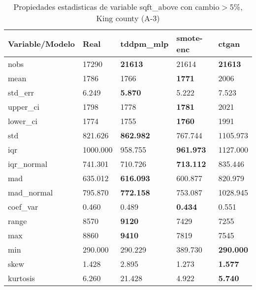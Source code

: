 \begin{table}[H]
\centering
\fontsize{8}{14}\selectfont
\caption{Propiedades estadisticas de variable sqft\_above con cambio\ensuremath{>}5\%, King county (A-3)}
\label{table-stats-king county-a-3-sqft_above-short}
\begin{tabular}{|l|m{10em}|m{10em}|m{10em}|m{10em}|}
\hline
 \rowcolor[gray]{0.8}
Variable/Modelo & Real & tddpm\_mlp & smote-enc & ctgan \\
\hline nobs & 17290 & \bfseries 21613 & \cellcolor[rgb]{0.9, 0.54, 0.52} 21614 & \bfseries 21613 \\
\hline mean & 1786 & 1766 & \bfseries 1771 & \cellcolor[rgb]{0.9, 0.54, 0.52} 2006 \\
\hline std\_err & 6.249 & \bfseries 5.870 & 5.222 & \cellcolor[rgb]{0.9, 0.54, 0.52} 7.523 \\
\hline upper\_ci & 1798 & 1778 & \bfseries 1781 & \cellcolor[rgb]{0.9, 0.54, 0.52} 2021 \\
\hline lower\_ci & 1774 & 1755 & \bfseries 1760 & \cellcolor[rgb]{0.9, 0.54, 0.52} 1991 \\
\hline std & 821.626 & \bfseries 862.982 & 767.744 & \cellcolor[rgb]{0.9, 0.54, 0.52} 1105.973 \\
\hline iqr & 1000.000 & 958.755 & \bfseries 961.973 & \cellcolor[rgb]{0.9, 0.54, 0.52} 1127.000 \\
\hline iqr\_normal & 741.301 & 710.726 & \bfseries 713.112 & \cellcolor[rgb]{0.9, 0.54, 0.52} 835.446 \\
\hline mad & 635.012 & \bfseries 616.093 & 600.877 & \cellcolor[rgb]{0.9, 0.54, 0.52} 820.979 \\
\hline mad\_normal & 795.870 & \bfseries 772.158 & 753.087 & \cellcolor[rgb]{0.9, 0.54, 0.52} 1028.945 \\
\hline coef\_var & 0.460 & 0.489 & \bfseries 0.434 & \cellcolor[rgb]{0.9, 0.54, 0.52} 0.551 \\
\hline range & 8570 & \bfseries 9120 & 7429 & \cellcolor[rgb]{0.9, 0.54, 0.52} 7255 \\
\hline max & 8860 & \bfseries 9410 & 7819 & \cellcolor[rgb]{0.9, 0.54, 0.52} 7545 \\
\hline min & 290.000 & 290.229 & \cellcolor[rgb]{0.9, 0.54, 0.52} 389.730 & \bfseries 290.000 \\
\hline skew & 1.428 & \cellcolor[rgb]{0.9, 0.54, 0.52} 2.895 & 1.273 & \bfseries 1.577 \\
\hline kurtosis & 6.260 & \cellcolor[rgb]{0.9, 0.54, 0.52} 21.428 & 4.922 & \bfseries 5.740 \\

\end{tabular}
\end{table}
